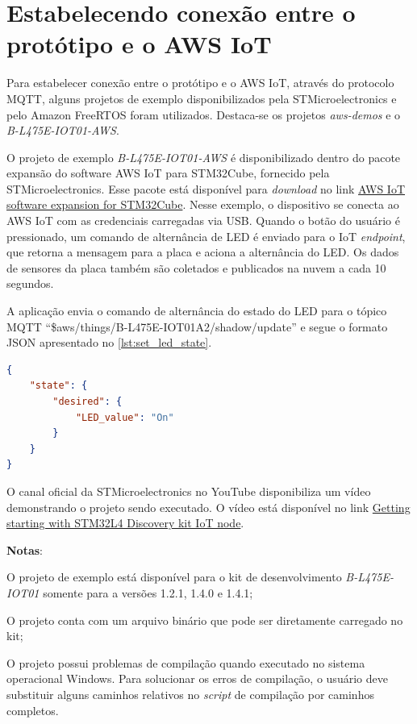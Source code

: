 \section{Estabelecendo conexão entre o protótipo e o AWS IoT}\label{section:estabelecendo_conexao_entre_o_prototipo_e_o_aws_iot}

Para estabelecer conexão entre o protótipo e o AWS IoT, através do protocolo MQTT, alguns projetos de exemplo disponibilizados pela STMicroelectronics e pelo Amazon FreeRTOS foram utilizados. Destaca-se os projetos \textit{aws-demos} e o \textit{B-L475E-IOT01-AWS}.

O projeto de exemplo \textit{B-L475E-IOT01-AWS} é disponibilizado dentro do pacote expansão do software AWS IoT para STM32Cube, fornecido pela STMicroelectronics. Esse pacote está disponível para \textit{download} no link \href{https://www.st.com/content/st_com/en/products/embedded-software/mcu-mpu-embedded-software/stm32-embedded-software/stm32cube-expansion-packages/x-cube-aws.html}{AWS IoT software expansion for STM32Cube}. Nesse exemplo, o dispositivo se conecta ao AWS IoT com as credenciais carregadas via USB. Quando o botão do usuário é pressionado, um comando de alternância de LED é enviado para o IoT \textit{endpoint}, que retorna a mensagem para a placa e aciona a alternância do LED. Os dados de sensores da placa também são coletados e publicados na nuvem a cada 10 segundos.

A aplicação envia o comando de alternância do estado do LED para o tópico MQTT ``\$aws/things/B-L475E-IOT01A2/shadow/update'' e segue o formato JSON apresentado no \autoref{lst:set_led_state}.

\begin{lstlisting}[float=htbp,language=json,firstnumber=1,caption={Formato da mensagem de alternância do estado do LED.},label=lst:set_led_state]
{
    "state": {
        "desired": {
            "LED_value": "On"
        }
    }
}
\end{lstlisting}

O canal oficial da STMicroelectronics no YouTube disponibiliza um vídeo demonstrando o projeto sendo executado. O vídeo está disponível no link \href{https://www.youtube.com/watch?v=6eUqxjBL_wI}{Getting starting with STM32L4 Discovery kit IoT node}.

\textbf{Notas}:
\begin{alineas}
    \item O projeto de exemplo está disponível para o kit de desenvolvimento \textit{B-L475E-IOT01} somente para a versões 1.2.1, 1.4.0 e 1.4.1;
    \item O projeto conta com um arquivo binário que pode ser diretamente carregado no kit;
    \item O projeto possui problemas de compilação quando executado no sistema operacional Windows. Para solucionar os erros de compilação, o usuário deve substituir alguns caminhos relativos no \textit{script} de compilação por caminhos completos.
\end{alineas}

